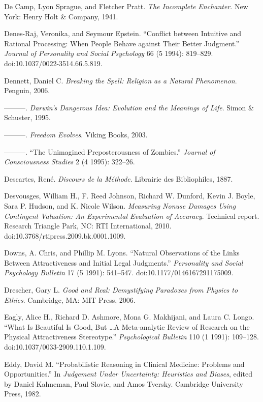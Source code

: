 {
 De Camp, Lyon Sprague, and Fletcher Pratt. \textit{The Incomplete
Enchanter}. New York: Henry Holt \& Company, 1941.}

{
 Denes-Raj, Veronika, and Seymour Epstein.
``Conflict between Intuitive and Rational Processing:
When People Behave against Their Better Judgment.''
\textit{Journal of Personality and Social Psychology} 66 (5 1994):
819--829. doi:10.1037/0022-3514.66.5.819.}

{
 Dennett, Daniel C. \textit{Breaking the Spell: Religion as a
Natural Phenomenon}. Penguin, 2006.}

{
 {}---{}---{}---. \textit{Darwin's Dangerous Idea:
Evolution and the Meanings of Life}. Simon \& Schuster, 1995.}

{
 {}---{}---{}---. \textit{Freedom Evolves}. Viking Books, 2003.}

{
 {}---{}---{}---. ``The Unimagined
Preposterousness of Zombies.'' \textit{Journal of
Consciousness Studies} 2 (4 1995): 322--26.}

{
 Descartes, René. \textit{Discours de la Méthode}. Librairie des
Bibliophiles, 1887.}

{
 Desvousges, William H., F. Reed Johnson, Richard W. Dunford, Kevin
J. Boyle, Sara P. Hudson, and K. Nicole Wilson. \textit{Measuring
Nonuse Damages Using Contingent Valuation: An Experimental Evaluation
of Accuracy}. Technical report. Research Triangle Park, NC: RTI
International, 2010. doi:10.3768/rtipress.2009.bk.0001.1009.}

{
 Downs, A. Chris, and Phillip M. Lyons. ``Natural
Observations of the Links Between Attractiveness and Initial Legal
Judgments.'' \textit{Personality and Social
Psychology Bulletin} 17 (5 1991): 541--547.
doi:10.1177/0146167291175009.}

{
 Drescher, Gary L. \textit{Good and Real: Demystifying Paradoxes
from Physics to Ethics}. Cambridge, MA: MIT Press, 2006.}

{
 Eagly, Alice H., Richard D. Ashmore, Mona G. Makhijani, and Laura
C. Longo. ``What Is Beautiful Is Good, But \ldots A
Meta-analytic Review of Research on the Physical Attractiveness
Stereotype.'' \textit{Psychological Bulletin} 110 (1
1991): 109--128. doi:10.1037/0033-2909.110.1.109.}

{
 Eddy, David M. ``Probabilistic Reasoning in
Clinical Medicine: Problems and Opportunities.'' In
\textit{Judgement Under Uncertainty: Heuristics and Biases}, edited by
Daniel Kahneman, Paul Slovic, and Amos Tversky. Cambridge University
Press, 1982.}

